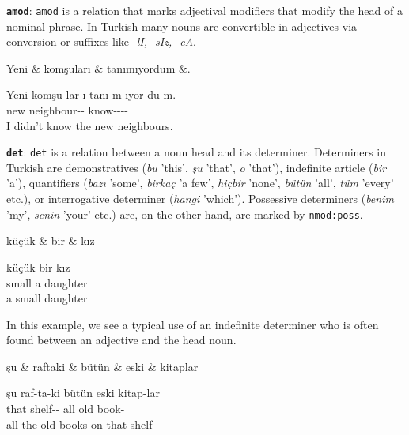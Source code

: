 \documentclass[11pt,a4paper]{article}
\begin{document}
\textbf{\texttt{amod}}:
\texttt{amod} is a relation that marks adjectival modifiers that modify the head of a nominal phrase. In Turkish many nouns are convertible in adjectives via conversion or suffixes like \textit{-lI, -sIz, -cA}.

\begin{exe}
\ex \label{amod}
\begin{dependency}
\begin{deptext}[column sep=0.22cm]
Yeni \& komşuları \& tanımıyordum \&. \\
\end{deptext}
\end{dependency}
\gll Yeni komşu-lar-ı tanı-m-ıyor-du-m.  \\
new neighbour-\Pl{}-\Acc{} know-\Neg{}-\Prog{}-\Pst{}-\Fsg{}\\
\glt I didn’t know the new neighbours.
\end{exe}

\textbf{\texttt{det}}:
\texttt{det} is a relation between a noun head and its determiner. Determiners in Turkish are demonstratives (\textit{bu} 'this', \textit{şu} 'that', \textit{o} 'that'), indefinite article (\textit{bir} 'a'), quantifiers (\textit{bazı} 'some', \textit{birkaç} 'a few', \textit{hiçbir} 'none', \textit{bütün} 'all', \textit{tüm} 'every' etc.), or interrogative determiner (\textit{hangi} 'which'). Possessive determiners (\textit{benim} 'my', \textit{senin} 'your' etc.) are, on the other hand, are marked by \texttt{nmod:poss}.

\begin{exe}
\ex \label{det}
\begin{dependency}
\begin{deptext}
küçük \& bir \& kız \\
\end{deptext}
\end{dependency}
\gll küçük bir kız  \\
small a daughter \\
\glt a small daughter
\end{exe}

In this example, we see a typical use of an indefinite determiner who is often found between an adjective and the head noun.

\begin{exe}
\ex \label{det2}
\begin{dependency}
\begin{deptext}
şu \& raftaki \& bütün \& eski \& kitaplar \\
\end{deptext}
\end{dependency}
\gll şu raf-ta-ki bütün eski kitap-lar  \\
that shelf-\Loc{}-\Adj{} all old book-\Pl{} \\
\glt all the old books on that shelf
\end{exe}
\end{document}
